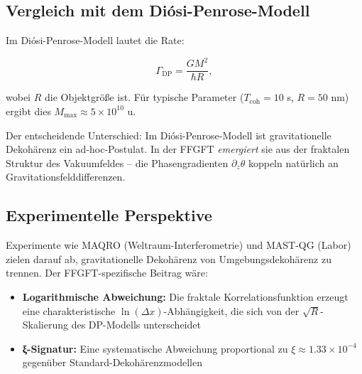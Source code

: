 	\subsection*{Vergleich mit dem Diósi-Penrose-Modell}
	
	Im Diósi-Penrose-Modell lautet die Rate:
	
	\begin{equation}
		\Gamma_{\text{DP}} = \frac{G M^2}{\hbar R},
	\end{equation}
	
	wobei \(R\) die Objektgröße ist. Für typische Parameter (\(T_{\text{coh}} = 10\) s, \(R = 50\) nm) ergibt dies \(M_{\max} \approx 5 \times 10^{10}\) u.
	
	\begin{center}
		\small
	\end{center}
	
	Der entscheidende Unterschied: Im Diósi-Penrose-Modell ist gravitationelle Dekohärenz ein ad-hoc-Postulat. In der FFGFT \emph{emergiert} sie aus der fraktalen Struktur des Vakuumfeldes – die Phasengradienten \(\partial_z \theta\) koppeln natürlich an Gravitationsfelddifferenzen.
	
	\subsection*{Experimentelle Perspektive}
	
	Experimente wie MAQRO (Weltraum-Interferometrie) und MAST-QG (Labor) zielen darauf ab, gravitationelle Dekohärenz von Umgebungsdekohärenz zu trennen. Der FFGFT-spezifische Beitrag wäre:
	
	\begin{itemize}
		\item \textbf{Logarithmische Abweichung:} Die fraktale Korrelationsfunktion erzeugt eine charakteristische \(\ln(\Delta x)\)-Abhängigkeit, die sich von der \(\sqrt{R}\)-Skalierung des DP-Modells unterscheidet
		\item \textbf{ξ-Signatur:} Eine systematische Abweichung proportional zu \(\xi \approx 1.33 \times 10^{-4}\) gegenüber Standard-Dekohärenzmodellen
	\end{itemize}
	
